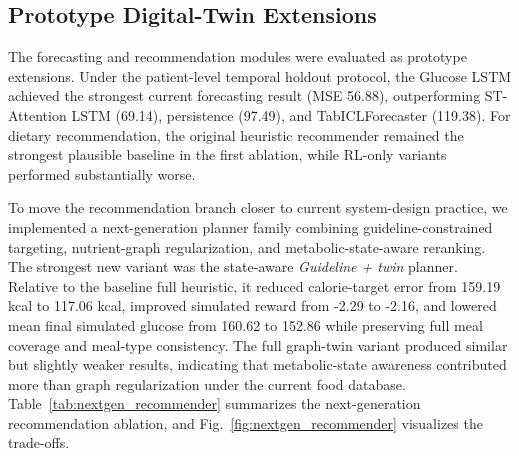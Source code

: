 \documentclass[conference]{IEEEtran}
\begin{document}
\subsection{Prototype Digital-Twin Extensions}
The forecasting and recommendation modules were evaluated as prototype extensions. Under the patient-level temporal holdout protocol, the Glucose LSTM achieved the strongest current forecasting result (MSE 56.88), outperforming ST-Attention LSTM (69.14), persistence (97.49), and TabICLForecaster (119.38). For dietary recommendation, the original heuristic recommender remained the strongest plausible baseline in the first ablation, while RL-only variants performed substantially worse.

To move the recommendation branch closer to current system-design practice, we implemented a next-generation planner family combining guideline-constrained targeting, nutrient-graph regularization, and metabolic-state-aware reranking. The strongest new variant was the state-aware \emph{Guideline + twin} planner. Relative to the baseline full heuristic, it reduced calorie-target error from 159.19 kcal to 117.06 kcal, improved simulated reward from -2.29 to -2.16, and lowered mean final simulated glucose from 160.62 to 152.86 while preserving full meal coverage and meal-type consistency. The full graph-twin variant produced similar but slightly weaker results, indicating that metabolic-state awareness contributed more than graph regularization under the current food database. Table~\ref{tab:nextgen_recommender} summarizes the next-generation recommendation ablation, and Fig.~\ref{fig:nextgen_recommender} visualizes the trade-offs.

\begin{table}[t]
\caption{Next-generation recommendation ablation.}
\label{tab:nextgen_recommender}
\centering
\small
{}
\end{table}
\end{document}
